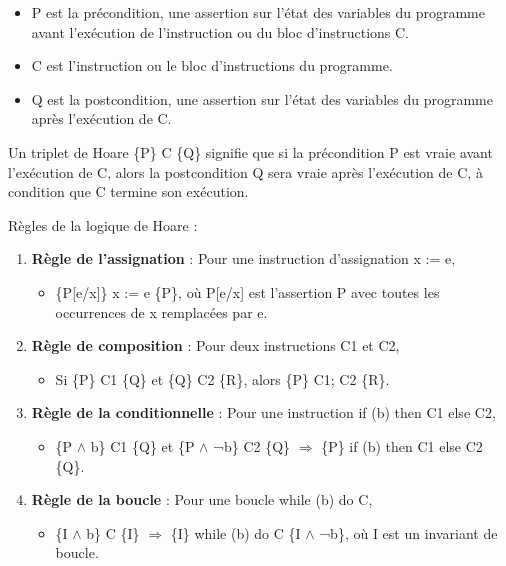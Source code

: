 \documentclass[11pt]{article}
\begin{document}
\begin{itemize}
\item P est la précondition, une assertion sur l'état des variables du programme avant l'exécution de l'instruction ou du bloc d'instructions C.
\item C est l'instruction ou le bloc d'instructions du programme.
\item Q est la postcondition, une assertion sur l'état des variables du programme après l'exécution de C.
\end{itemize}

Un triplet de Hoare \{P\} C \{Q\} signifie que si la précondition P est vraie avant l'exécution de C, alors la postcondition Q sera vraie après l'exécution de C, à condition que C termine son exécution.

Règles  de la logique de Hoare : 
\begin{enumerate}
\item \textbf{\textbf{Règle de l'assignation}} : Pour une instruction d'assignation x := e,
\begin{itemize}
\item \{P[e/x]\} x := e \{P\}, où P[e/x] est l'assertion P avec toutes les occurrences de x remplacées par e.
\end{itemize}

\item \textbf{\textbf{Règle de composition}} : Pour deux instructions C1 et C2,
\begin{itemize}
\item Si \{P\} C1 \{Q\} et \{Q\} C2 \{R\}, alors \{P\} C1; C2 \{R\}.
\end{itemize}

\item \textbf{\textbf{Règle de la conditionnelle}} : Pour une instruction if (b) then C1 else C2,
\begin{itemize}
\item \{P \(\wedge\) b\} C1 \{Q\} et \{P \(\wedge\) ¬b\} C2 \{Q\} \(\Rightarrow\) \{P\} if (b) then C1 else C2 \{Q\}.
\end{itemize}

\item \textbf{\textbf{Règle de la boucle}} : Pour une boucle while (b) do C,
\begin{itemize}
\item \{I \(\wedge\) b\} C \{I\} \(\Rightarrow\) \{I\} while (b) do C \{I \(\wedge\) ¬b\}, où I est un invariant de boucle.
\end{itemize}
\end{enumerate}
\end{document}
